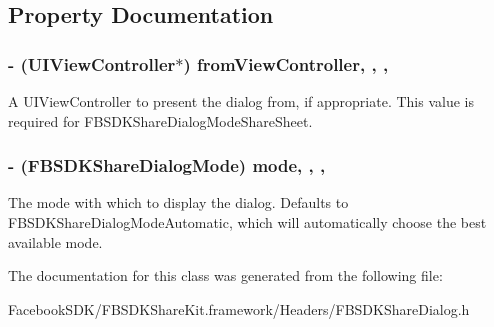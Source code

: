\subsection{Property Documentation}
\hypertarget{interface_f_b_s_d_k_share_dialog_a1319782aa7ce9db59c35ac6a9bb9a2c9}{
\subsubsection[{from\-View\-Controller}]{\setlength{\rightskip}{0pt plus 5cm}-\/ (U\-I\-View\-Controller$\ast$) from\-View\-Controller\hspace{0.3cm}{\ttfamily [read]}, {\ttfamily [write]}, {\ttfamily [nonatomic]}, {\ttfamily [weak]}}}\label{interface_f_b_s_d_k_share_dialog_a1319782aa7ce9db59c35ac6a9bb9a2c9}
A U\-I\-View\-Controller to present the dialog from, if appropriate.  This value is required for F\-B\-S\-D\-K\-Share\-Dialog\-Mode\-Share\-Sheet. \hypertarget{interface_f_b_s_d_k_share_dialog_a2fa09cba91a90a644c2cd8dd26de372d}{
\subsubsection[{mode}]{\setlength{\rightskip}{0pt plus 5cm}-\/ (F\-B\-S\-D\-K\-Share\-Dialog\-Mode) mode\hspace{0.3cm}{\ttfamily [read]}, {\ttfamily [write]}, {\ttfamily [nonatomic]}, {\ttfamily [assign]}}}\label{interface_f_b_s_d_k_share_dialog_a2fa09cba91a90a644c2cd8dd26de372d}
The mode with which to display the dialog.  Defaults to F\-B\-S\-D\-K\-Share\-Dialog\-Mode\-Automatic, which will automatically choose the best available mode. 

The documentation for this class was generated from the following file\-:\begin{DoxyCompactItemize}
\item 
Facebook\-S\-D\-K/\-F\-B\-S\-D\-K\-Share\-Kit.\-framework/\-Headers/F\-B\-S\-D\-K\-Share\-Dialog.\-h\end{DoxyCompactItemize}
